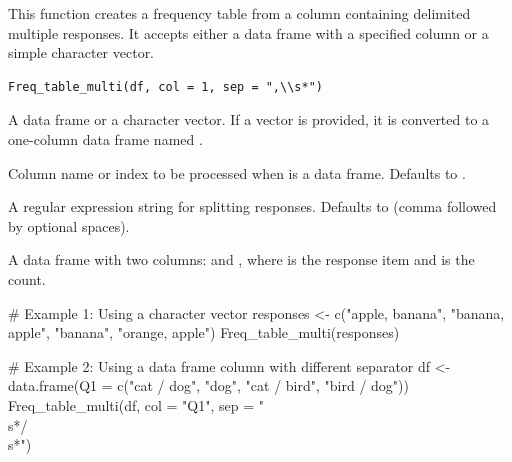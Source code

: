 \documentclass[a4paper]{book}
\begin{document}
%
\begin{Description}
This function creates a frequency table from a column containing delimited multiple responses.
It accepts either a data frame with a specified column or a simple character vector.
\end{Description}
%
\begin{Usage}
\begin{verbatim}
Freq_table_multi(df, col = 1, sep = ",\\s*")
\end{verbatim}
\end{Usage}
%
\begin{Arguments}
\begin{ldescription}
\item[\code{df}] A data frame or a character vector. If a vector is provided, it is converted to a one-column data frame named .

\item[\code{col}] Column name or index to be processed when  is a data frame. Defaults to .

\item[\code{sep}] A regular expression string for splitting responses. Defaults to  (comma followed by optional spaces).
\end{ldescription}
\end{Arguments}
%
\begin{Value}
A data frame with two columns:  and , where  is the response item and  is the count.
\end{Value}
%
\begin{Examples}
\begin{ExampleCode}
# Example 1: Using a character vector
responses <- c("apple, banana", "banana, apple", "banana", "orange, apple")
Freq_table_multi(responses)

# Example 2: Using a data frame column with different separator
df <- data.frame(Q1 = c("cat / dog", "dog", "cat / bird", "bird / dog"))
Freq_table_multi(df, col = "Q1", sep = "\\s*/\\s*")
\end{ExampleCode}
\end{Examples}
\end{document}
